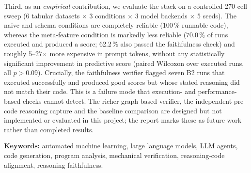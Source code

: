 Third, as an \emph{empirical} contribution, we evaluate the stack on
a controlled 270-cell sweep (6 tabular datasets $\times$ 3
conditions $\times$ 3 model backends $\times$ 5 seeds). The naive and
schema conditions are completely reliable (100\,\% runnable code),
whereas the meta-feature condition is markedly less reliable
(70.0\,\% of runs executed and produced a score; 62.2\,\% also passed
the faithfulness check) and roughly 5--27$\times$ more expensive in
prompt tokens, without any statistically significant improvement in
predictive score (paired Wilcoxon over executed runs, all $p>0.09$). Crucially, the faithfulness verifier
flagged seven B2 runs that executed successfully and produced good
scores but whose stated reasoning did not match their code. This is a
failure mode that execution- and performance-based checks cannot
detect. The richer graph-based verifier, the independent pre-code
reasoning capture and the baseline comparison are designed but not
implemented or evaluated in this project; the report marks these as
future work rather than completed results.

\medskip

\noindent\textbf{Keywords:} automated machine learning, large language
models, LLM agents, code generation, program analysis, mechanical
verification, reasoning-code alignment, reasoning faithfulness.

